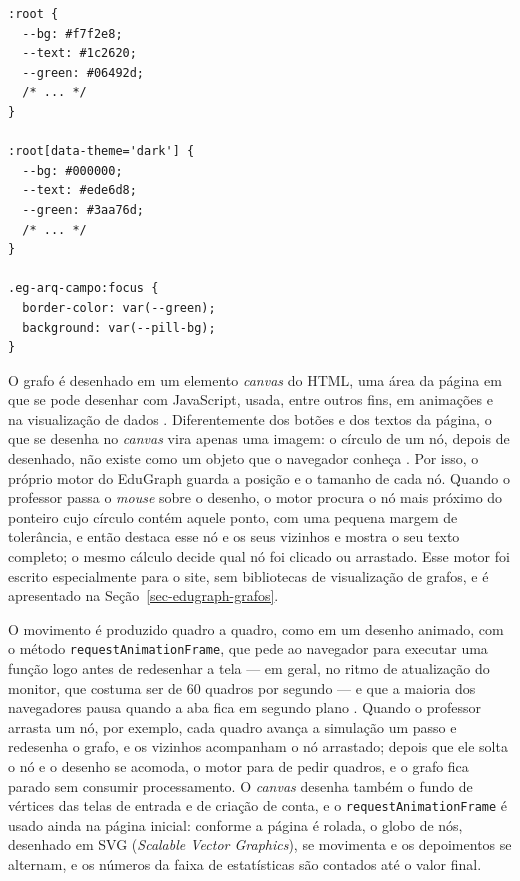 \begin{lstlisting}[caption={Variáveis de cor do tema claro e do escuro e o uso de algumas delas},label={lst-tec-css}]
:root {
  --bg: #f7f2e8;
  --text: #1c2620;
  --green: #06492d;
  /* ... */
}

:root[data-theme='dark'] {
  --bg: #000000;
  --text: #ede6d8;
  --green: #3aa76d;
  /* ... */
}

.eg-arq-campo:focus {
  border-color: var(--green);
  background: var(--pill-bg);
}
\end{lstlisting}

O grafo é desenhado em um elemento \textit{canvas} do HTML, uma área da página em que se pode desenhar com JavaScript, usada, entre outros fins, em animações e na visualização de dados \cite{mdn2026canvas}. Diferentemente dos botões e dos textos da página, o que se desenha no \textit{canvas} vira apenas uma imagem: o círculo de um nó, depois de desenhado, não existe como um objeto que o navegador conheça \cite{mdn2026canvas}. Por isso, o próprio motor do EduGraph guarda a posição e o tamanho de cada nó. Quando o professor passa o \textit{mouse} sobre o desenho, o motor procura o nó mais próximo do ponteiro cujo círculo contém aquele ponto, com uma pequena margem de tolerância, e então destaca esse nó e os seus vizinhos e mostra o seu texto completo; o mesmo cálculo decide qual nó foi clicado ou arrastado. Esse motor foi escrito especialmente para o site, sem bibliotecas de visualização de grafos, e é apresentado na Seção~\ref{sec-edugraph-grafos}.

O movimento é produzido quadro a quadro, como em um desenho animado, com o método \texttt{requestAnimationFrame}, que pede ao navegador para executar uma função logo antes de redesenhar a tela --- em geral, no ritmo de atualização do monitor, que costuma ser de 60 quadros por segundo --- e que a maioria dos navegadores pausa quando a aba fica em segundo plano \cite{mdn2026raf}. Quando o professor arrasta um nó, por exemplo, cada quadro avança a simulação um passo e redesenha o grafo, e os vizinhos acompanham o nó arrastado; depois que ele solta o nó e o desenho se acomoda, o motor para de pedir quadros, e o grafo fica parado sem consumir processamento. O \textit{canvas} desenha também o fundo de vértices das telas de entrada e de criação de conta, e o \texttt{requestAnimationFrame} é usado ainda na página inicial: conforme a página é rolada, o globo de nós, desenhado em SVG (\textit{Scalable Vector Graphics}), se movimenta e os depoimentos se alternam, e os números da faixa de estatísticas são contados até o valor final.

